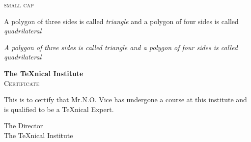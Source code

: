 \documentclass[a4paper, UTF8]{article}
\begin{document}
\textsc{small cap}

A polygon of three sides is called \emph{triangle} and a polygon of four sides is called \emph{quadrilateral}

\textit{A polygon of three sides is called \emph{triangle} and a polygon of four sides is called \emph{quadrilateral}}

\newpage
\begin{center}
	{\bfseries\huge The \TeX nical Institute}\\[1cm]
	{\scshape\LARGE Certificate}
\end{center}

\noindent This is to certify that Mr.N.O. Vice has undergone a course at this institute and is qualified to be a \TeX nical Expert.

\begin{flushright}
{\sffamily The Director\\
The \TeX nical Institute}
\end{flushright}
\end{document}
